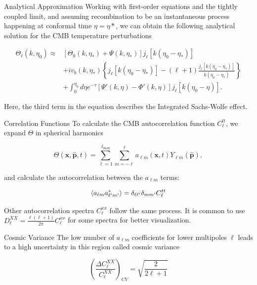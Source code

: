 \documentclass[serif, aspectratio=169]{beamer}
\begin{document}
\begin{frame}{Analytical Approximation}
Working with first-order equations and the tightly coupled limit, and assuming recombination to be an instantaneous process happening at conformal time $\eta=\eta*$, we can obtain the following analytical solution for the CMB temperature perturbations

\begin{equation}\label{Thetal_approx}
\begin{split}
    \Theta_\ell(k,\eta_0)\approx &[\Theta_0(k,\eta_*)+\Psi(k,\eta_*)]j_\ell[k(\eta_0-\eta_*)]\\
    &+iv_b(k,\eta_*)\left\{j_\ell[k(\eta_0-\eta_*)]-(\ell+1)\frac{j_\ell[k(\eta_0-\eta_*)]}{k(\eta_0-\eta_*)}\right\}\\
    &+\int_0^{\eta_0} d\eta e^{-\tau}[\Psi'(k,\eta)-\Phi'(k,\eta)]j_\ell[k(\eta_0-\eta)].
\end{split}
\end{equation}

Here, the third term in the equation describes the Integrated Sachs-Wolfe effect.
\end{frame}

\begin{frame}{Correlation Functions}
To calculate the CMB autocorrelation function $C_\ell^{tt}$, we expand $\Theta$ in spherical harmonics

\begin{equation}
    \Theta(\mathbf{x}, \hat{\mathbf{p}},t)=\sum_{\ell=1}^{\ell_\text{max}}\sum_{m=-\ell}^\ell a_{\ell m}(\mathbf{x},t)Y_{\ell m}(\hat{\mathbf{p}}),
\end{equation}

and calculate the autocorrelation between the $a_{\ell m}$ terms:

\begin{equation}
    \left\langle a_{\ell m} a_{\ell' m'}^* \right\rangle=\delta_{\ell \ell'}\delta_{m m'}C_\ell^{tt}
\end{equation}

Other autocorrelation spectra $C_\ell^{xx}$ follow the same process. It is common to use $D_\ell^{XX}=\frac{\ell(\ell+1)}{2\pi}C_\ell^{xx}$ for some spectra for better visualization.

\end{frame}

\begin{frame}{Cosmic Variance}
    The low number of $a_{\ell m}$ coefficients for lower multipoles $\ell$ leads to a high uncertainty in this region called cosmic variance

    \begin{equation}\label{cosmic_variance}
        \left(\frac{\Delta C_\ell^{XX}}{C_\ell^{XX}}\right)_{CV}=\sqrt{\frac{2}{2\ell+1}}
    \end{equation}
\end{frame}
\end{document}
